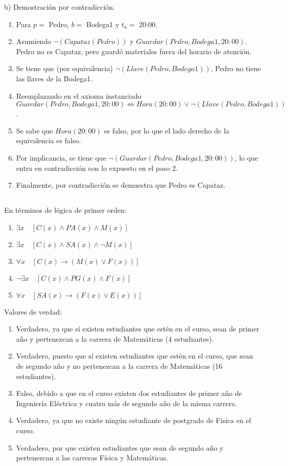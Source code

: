 \documentclass[11pt]{utalcaDoc}
\begin{document}
\begin{enumerate}
b) Demostración por contradicción.
\begin{enumerate}
\item Para $p = $ Pedro, $b = $ Bodega1 y $t_a = $ 20:00.
\item Asumiendo $\neg(Capataz(Pedro))$ y $Guardar(Pedro,Bodega1,20:00)$. Pedro no es Capataz, pero guardó materiales fuera del horario de atención.
\item Se tiene que (por equivalencia) $\neg (Llave(Pedro, Bodega1))$, Pedro no tiene las llaves de la Bodega1.
\item Reemplazando en el axioma instanciado \\ $Guardar(Pedro,Bodega1,20:00) \iff Hora(20:00) \lor \neg (Llave(Pedro, Bodega1)) $.
\item Se sabe que $Hora(20:00)$ es falso, por lo que el lado derecho de la equivalencia es falso.
\item Por implicancia, se tiene que $\neg(Guardar(Pedro,Bodega1,20:00))$, lo que entra en contradicción con lo expuesto en el paso 2.
\item Finalmente, por contradicción se demuestra que Pedro es Capataz.
\end{enumerate}


\end{enumerate}

\newpage
\subsection{ } %
En términos de lógica de primer orden:
\begin{enumerate}
\item $\exists x \quad [C(x) \wedge PA(x) \wedge M(x)]$
\item $\exists x \quad [C(x) \wedge SA(x) \wedge \neg M(x)]$
\item $\forall x \quad [C(x) \to (M(x) \lor F(x))]$
\item $\neg \exists x \quad [C(x) \wedge PG(x) \wedge F(x)]$
\item $\forall x \quad [SA(x) \to (F(x) \lor E(x))]$
\end{enumerate} 

Valores de verdad:
\begin{enumerate}
\item Verdadero, ya que sí existen estudiantes que estén en el curso, sean de primer año y pertenezcan a la carrera de Matemáticas (4 estudiantes).
\item Verdadero, puesto que sí existen estudiantes que estén en el curso, que sean de segundo año y no pertenezcan a la carrera de Matemáticas (16 estudiantes).
\item Falso, debido a que en el curso existen dos estudiantes de primer año de Ingeniería Eléctrica y cuatro más de segundo año de la misma carrera.
\item Verdadero, ya que no existe ningún estudiante de postgrado de Física en el curso.
\item Verdadero, por que existen estudiantes que sean de segundo año y pertenezcan a las carreras Física y Matemáticas.
\end{enumerate}
 
\end{document}
